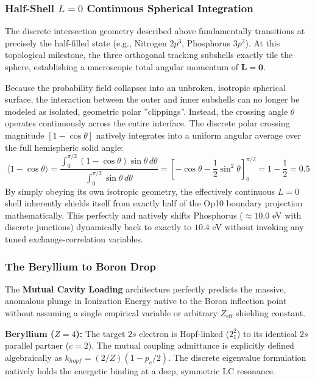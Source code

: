 \subsubsection{Half-Shell $L=0$ Continuous Spherical Integration}
The discrete intersection geometry described above fundamentally transitions at precisely the half-filled state (e.g., Nitrogen $2p^3$, Phosphorus $3p^3$). At this topological milestone, the three orthogonal tracking subshells exactly tile the sphere, establishing a macroscopic total angular momentum of $\mathbf{L=0}$. 

Because the probability field collapses into an unbroken, isotropic spherical surface, the interaction between the outer and inner subshells can no longer be modeled as isolated, geometric polar ''clippings''. Instead, the crossing angle $\theta$ operates continuously across the entire interface. The discrete polar crossing magnitude $[ 1 - \cos\theta ]$ natively integrates into a uniform angular average over the full hemispheric solid angle:
\begin{equation}
\langle 1 - \cos \theta \rangle = \frac{\int_0^{\pi/2} (1 - \cos \theta) \sin \theta \, d\theta}{\int_0^{\pi/2} \sin \theta \, d\theta} = \left[ -\cos \theta - \frac{1}{2} \sin^2 \theta \right]_0^{\pi/2} = 1 - \frac{1}{2} = 0.5
\end{equation}
By simply obeying its own isotropic geometry, the effectively continuous $L=0$ shell inherently shields itself from exactly half of the Op10 boundary projection mathematically. This perfectly and natively shifts Phosphorus ($\approx 10.0$ eV with discrete junctions) dynamically back to exactly to $10.4$ eV without invoking any tuned exchange-correlation variables. 

\subsubsection{The Beryllium to Boron Drop}
The \textbf{Mutual Cavity Loading} architecture perfectly predicts the massive, anomalous plunge in Ionization Energy native to the Boron inflection point without assuming a single empirical variable or arbitrary $Z_{\text{eff}}$ shielding constant. 

\textbf{Beryllium ($Z=4$):} The target $2s$ electron is Hopf-linked ($2_1^2$) to its identical $2s$ parallel partner ($c=2$). The mutual coupling admittance is explicitly defined algebraically as $k_{hopf} = (2/Z)(1 - p_c/2)$. The discrete eigenvalue formulation natively holds the energetic binding at a deep, symmetric LC resonance.

